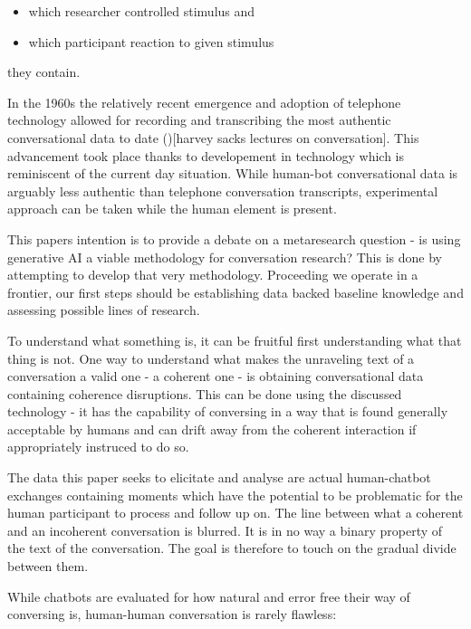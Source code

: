 \documentclass[12pt]{report}
\begin{document}
\begin{itemize}

    \item
    which researcher controlled stimulus and

    \item
    which participant reaction to given stimulus
\end{itemize}

they contain.

\par
In the 1960s the relatively recent emergence and adoption of telephone technology
allowed for recording and transcribing the most authentic conversational data to date ()[harvey sacks lectures on conversation].
This advancement took place thanks to developement in technology
which is reminiscent of the current day situation.
While human-bot conversational data is arguably less authentic than telephone conversation transcripts,
experimental approach can be taken while the human element is present.

\par
This papers intention is to provide a debate on a metaresearch question -
is using generative AI a viable methodology for conversation research?
This is done by attempting to develop that very methodology.
Proceeding we operate in a frontier,
our first steps should be establishing data backed baseline knowledge
and assessing possible lines of research.

\par
To understand what something is,
it can be fruitful first understanding what that thing is not.
One way to understand what makes the unraveling text of a conversation
a valid one - a coherent one -
is obtaining conversational data containing coherence disruptions.
This can be done using the discussed technology -
it has the capability of conversing in a way
that is found generally acceptable by humans
and can drift away from the coherent interaction
if appropriately instruced to do so.

\par
The data this paper seeks to elicitate and analyse are
actual human-chatbot exchanges containing moments which
have the potential to be problematic for
the human participant to process and follow up on.
The line between what a coherent and an incoherent conversation is blurred.
It is in no way a binary property of the text of the conversation.
The goal is therefore to touch on the gradual divide between them.

\par
While chatbots are evaluated for how natural and error free their way of conversing is,
human-human conversation is rarely flawless:
\end{document}
